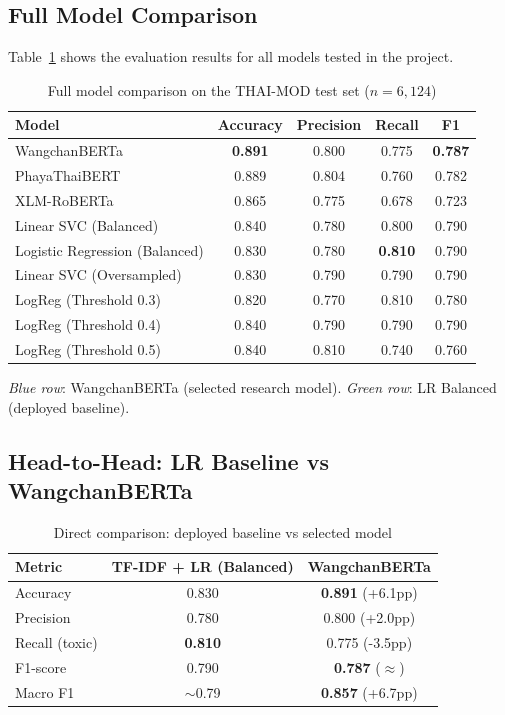 \documentclass[11pt,a4paper]{article}
\begin{document}
\subsection{Full Model Comparison}

Table~\ref{tab:full-comparison} shows the evaluation results for all models tested in the project.

\begin{table}[H]
\centering
\caption{Full model comparison on the THAI-MOD test set ($n = 6{,}124$)}
\label{tab:full-comparison}
\begin{tabular}{@{}lcccc@{}}
\toprule
\textbf{Model} & \textbf{Accuracy} & \textbf{Precision} & \textbf{Recall} & \textbf{F1} \\
\midrule
\rowcolor{blue!8}
WangchanBERTa               & \textbf{0.891} & 0.800 & 0.775 & \textbf{0.787} \\
PhayaThaiBERT                & 0.889 & 0.804 & 0.760 & 0.782 \\
XLM-RoBERTa                  & 0.865 & 0.775 & 0.678 & 0.723 \\
\midrule
Linear SVC (Balanced)        & 0.840 & 0.780 & 0.800 & 0.790 \\
\rowcolor{green!8}
Logistic Regression (Balanced) & 0.830 & 0.780 & \textbf{0.810} & 0.790 \\
Linear SVC (Oversampled)     & 0.830 & 0.790 & 0.790 & 0.790 \\
LogReg (Threshold 0.3)       & 0.820 & 0.770 & 0.810 & 0.780 \\
LogReg (Threshold 0.4)       & 0.840 & 0.790 & 0.790 & 0.790 \\
LogReg (Threshold 0.5)       & 0.840 & 0.810 & 0.740 & 0.760 \\
\bottomrule
\end{tabular}
\end{table}

\textit{Blue row}: WangchanBERTa (selected research model). \textit{Green row}: LR Balanced (deployed baseline).

\subsection{Head-to-Head: LR Baseline vs WangchanBERTa}

\begin{table}[H]
\centering
\caption{Direct comparison: deployed baseline vs selected model}
\label{tab:head-to-head}
\begin{tabular}{@{}lcc@{}}
\toprule
\textbf{Metric} & \textbf{TF-IDF + LR (Balanced)} & \textbf{WangchanBERTa} \\
\midrule
Accuracy        & 0.830 & \textbf{0.891} (+6.1pp) \\
Precision       & 0.780 & 0.800 (+2.0pp) \\
Recall (toxic)  & \textbf{0.810} & 0.775 (-3.5pp) \\
F1-score        & 0.790 & \textbf{0.787} ($\approx$) \\
Macro F1        & $\sim$0.79 & \textbf{0.857} (+6.7pp) \\
\bottomrule
\end{tabular}
\end{table}
\end{document}
